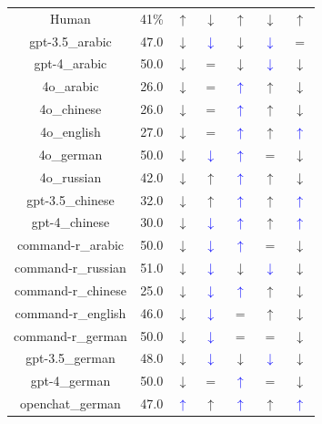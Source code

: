 \documentclass{article}
\newcommand{\bluearrow}[1]{\textcolor{blue}{#1}}
\begin{document}
\begin{table}
\begin{tabular}{ccccccc}
Human       & 41\%  & $\uparrow$ & $\downarrow$ & $\uparrow$ & $\downarrow$ & $\uparrow$ \\
gpt-3.5\_arabic & 47.0 & $\downarrow$ & \bluearrow{$\downarrow$} & $\downarrow$ & \bluearrow{$\downarrow$} & $= $\\
gpt-4\_arabic & 50.0 & $\downarrow$ & $=$ & $\downarrow$ & \bluearrow{$\downarrow$} & $\downarrow $\\
4o\_arabic & 26.0 & $\downarrow$ & $=$ & \bluearrow{$\uparrow$} & $\uparrow$ & $\downarrow $\\
4o\_chinese & 26.0 & $\downarrow$ & $=$ & \bluearrow{$\uparrow$} & $\uparrow$ & $\downarrow $\\
4o\_english & 27.0 & $\downarrow$ & $=$ & \bluearrow{$\uparrow$} & $\uparrow$ & \bluearrow{$\uparrow $}\\
4o\_german & 50.0 & $\downarrow$ & \bluearrow{$\downarrow$} & \bluearrow{$\uparrow$} & $=$ & $\downarrow $\\
4o\_russian & 42.0 & $\downarrow$ & $\uparrow$ & \bluearrow{$\uparrow$} & $\uparrow$ & $\downarrow $\\
gpt-3.5\_chinese & 32.0 & $\downarrow$ & $\uparrow$ & \bluearrow{$\uparrow$} & $\uparrow$ & \bluearrow{$\uparrow $}\\
gpt-4\_chinese & 30.0 & $\downarrow$ & \bluearrow{$\downarrow$} & \bluearrow{$\uparrow$} & $\uparrow$ & \bluearrow{$\uparrow $}\\
command-r\_arabic & 50.0 & $\downarrow$ & \bluearrow{$\downarrow$} & \bluearrow{$\uparrow$} & $=$ & $\downarrow $\\
command-r\_russian & 51.0 & $\downarrow$ & \bluearrow{$\downarrow$} & $\downarrow$ & \bluearrow{$\downarrow$} & $\downarrow $\\
command-r\_chinese & 25.0 & $\downarrow$ & \bluearrow{$\downarrow$} & \bluearrow{$\uparrow$} & $\uparrow$ & $\downarrow $\\
command-r\_english & 46.0 & $\downarrow$ & \bluearrow{$\downarrow$} & $=$ & $\uparrow$ & $\downarrow $\\
command-r\_german & 50.0 & $\downarrow$ & \bluearrow{$\downarrow$} & $=$ & $=$ & $\downarrow $\\
gpt-3.5\_german & 48.0 & $\downarrow$ & \bluearrow{$\downarrow$} & $\downarrow$ & \bluearrow{$\downarrow$} & $\downarrow $\\
gpt-4\_german & 50.0 & $\downarrow$ & $=$ & \bluearrow{$\uparrow$} & $=$ & $\downarrow $\\
openchat\_german & 47.0 & \bluearrow{$\uparrow$} & $\uparrow$ & \bluearrow{$\uparrow$} & $\uparrow$ & \bluearrow{$\uparrow $}\\


\end{tabular}
\end{table}
\end{document}
